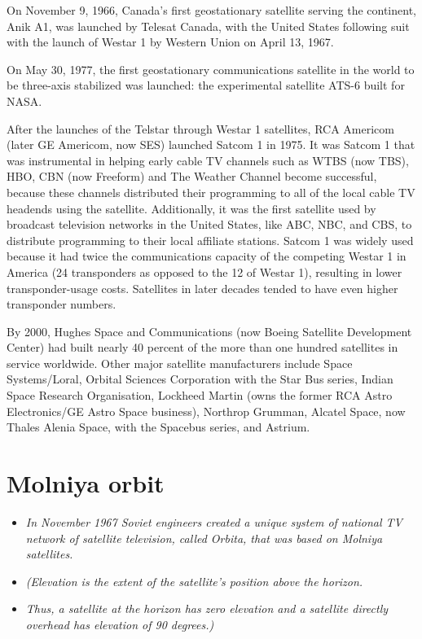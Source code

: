 On November 9, 1966, Canada's first geostationary satellite serving the
continent, Anik A1, was launched by Telesat Canada, with the United
States following suit with the launch of Westar 1 by Western Union on
April 13, 1967.

On May 30, 1977, the first geostationary communications satellite in the
world to be three-axis stabilized was launched: the experimental
satellite ATS-6 built for NASA.

After the launches of the Telstar through Westar 1 satellites, RCA
Americom (later GE Americom, now SES) launched Satcom 1 in 1975. It was
Satcom 1 that was instrumental in helping early cable TV channels such
as WTBS (now TBS), HBO, CBN (now Freeform) and The Weather Channel
become successful, because these channels distributed their programming
to all of the local cable TV headends using the satellite. Additionally,
it was the first satellite used by broadcast television networks in the
United States, like ABC, NBC, and CBS, to distribute programming to
their local affiliate stations. Satcom 1 was widely used because it had
twice the communications capacity of the competing Westar 1 in America
(24 transponders as opposed to the 12 of Westar 1), resulting in lower
transponder-usage costs. Satellites in later decades tended to have even
higher transponder numbers.

By 2000, Hughes Space and Communications (now Boeing Satellite
Development Center) had built nearly 40 percent of the more than one
hundred satellites in service worldwide. Other major satellite
manufacturers include Space Systems/Loral, Orbital Sciences Corporation
with the Star Bus series, Indian Space Research Organisation, Lockheed
Martin (owns the former RCA Astro Electronics/GE Astro Space business),
Northrop Grumman, Alcatel Space, now Thales Alenia Space, with the
Spacebus series, and Astrium.

\section{Molniya orbit}\label{molniya-orbit}

\begin{itemize}
\item
  \emph{In November 1967 Soviet engineers created a unique system of
  national TV network of satellite television, called Orbita, that was
  based on Molniya satellites.}
\item
  \emph{(Elevation is the extent of the satellite's position above the
  horizon.}
\item
  \emph{Thus, a satellite at the horizon has zero elevation and a
  satellite directly overhead has elevation of 90 degrees.)}
\end{itemize}


